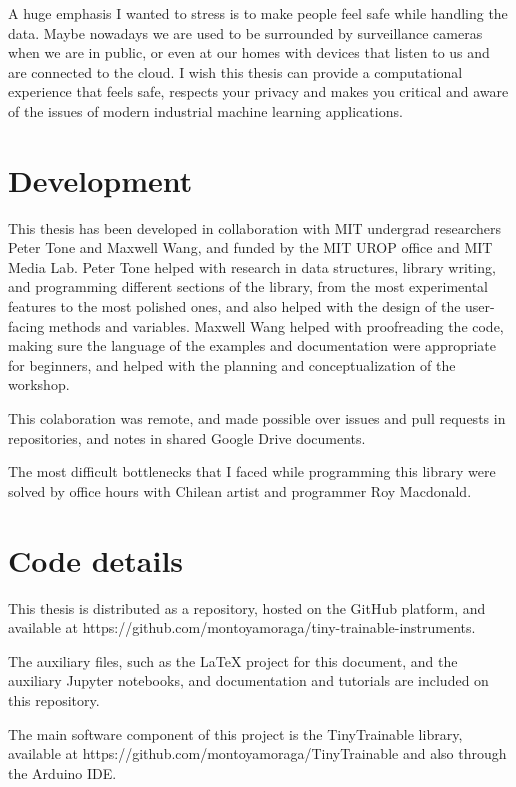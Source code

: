 A huge emphasis I wanted to stress is to make people feel safe while handling the data. Maybe nowadays we are used to be surrounded by surveillance cameras when we are in public, or even at our homes with devices that listen to us and are connected to the cloud. I wish this thesis can provide a computational experience that feels safe, respects your privacy and makes you critical and aware of the issues of modern industrial machine learning applications.

\section{Development}

This thesis has been developed in collaboration with MIT undergrad researchers Peter Tone and Maxwell Wang, and funded by the MIT UROP office and MIT Media Lab. Peter Tone helped with research in data structures, library writing, and programming different sections of the library, from the most experimental features to the most polished ones, and also helped with the design of the user-facing methods and variables. Maxwell Wang helped with proofreading the code, making sure the language of the examples and documentation were appropriate for beginners, and helped with the planning and conceptualization of the workshop. 

This colaboration was remote, and made possible over issues and pull requests in repositories, and notes in shared Google Drive documents.

The most difficult bottlenecks that I faced while programming this library were solved by office hours with Chilean artist and programmer Roy Macdonald.

\section{Code details}

This thesis is distributed as a repository, hosted on the GitHub platform, and available at https://github.com/montoyamoraga/tiny-trainable-instruments.

The auxiliary files, such as the LaTeX project for this document, and the auxiliary Jupyter notebooks, and documentation and tutorials are included on this repository.

The main software component of this project is the TinyTrainable library, available at https://github.com/montoyamoraga/TinyTrainable and also through the Arduino IDE.

